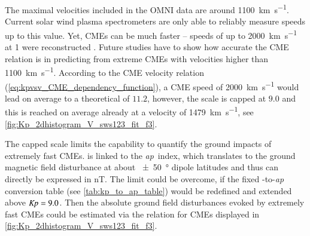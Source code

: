 The maximal velocities included in the OMNI data are around \SI{1100}{\km\per\s}. Current solar wind plasma spectrometers are only able to reliably measure speeds up to this value. Yet, CMEs can be much faster -- speeds of up to \SI{2000}{\km\per\s} at \SI{1}{\au} were reconstructed \citep{Russell2013}. Future studies have to show how accurate the CME relation is in predicting \Kp{} from extreme CMEs with velocities higher than \SI{1100}{\km\per\s}. According to the CME velocity relation (\ref{eq:kpvsv_CME_dependency_function}), a CME speed of \SI{2000}{\km\per\s} would lead on average to a theoretical \Kp{} of $11.2$, however, the \Kp{} scale is capped at $9.0$ and this \Kp{} is reached on average already at a velocity of \SI{1479}{\km\per\s}, see \autoref{fig:Kp_2dhistogram_V_sws123_fit_f3}.
\begin{figure}
\end{figure}

The capped \Kp{} scale limits the capability to quantify the ground impacts of extremely fast CMEs. \Kp{} is linked to the \textit{ap}~index, which translates to the ground magnetic field disturbance at about \SI{+-50}{\degree} dipole latitudes and thus can directly be expressed in \si{\nano\tesla}. The limit could be overcome, if the fixed \Kp-to-\textit{ap} conversion table (see \autoref{tab:kp_to_ap_table}) would be redefined and extended above $\text{\textit{Kp}} = 9.0$. Then the absolute ground field disturbances evoked by extremely fast CMEs could be estimated via the \Kp{} relation for CMEs displayed in \autoref{fig:Kp_2dhistogram_V_sws123_fit_f3}.

